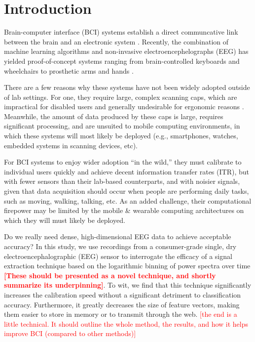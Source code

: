 \section{Introduction}


Brain-computer interface (BCI) systems establish a direct communcative link between the brain and an electronic system \cite{dornhege_toward_2007,mcfarland_brain-computer_2011}.  Recently, the combination of machine learning algorithms and non-invasive electroencephelographs (EEG) has yielded proof-of-concept systems ranging from brain-controlled keyboards and wheelchairs to prosthetic arms and hands \cite{blankertz_note_2007,millan_combining_2010,d._mattia_brain_2011,hill_practical_2014,campbell_neurophone:_2010}. 

There are a few reasons why these systems have not been widely adopted outside of lab settings. For one, they require large, complex scanning caps, which are impractical for disabled users and generally undesirable for ergonomic reasons \cite{ekandem_evaluating_2012,leeb_transferring_2013}. Meanwhile, the amount of data produced by these caps is large, requires significant processing, and are unsuited to mobile computing environments, in which these systems will most likely be deployed (e.g., smartphones, watches, embedded systems in scanning devices, etc). 

For BCI systems to enjoy wider adoption ``in the wild,'' they must calibrate to individual users quickly and achieve decent information transfer rates (ITR), but with fewer sensors than their lab-based counterparts, and with noisier signals, given that data acquisition should occur when people are performing daily tasks, such as moving, walking, talking, etc. As an added challenge, their computational firepower may be limited by the mobile \& wearable computing architectures on which they will must likely be deployed.

Do we really need dense, high-dimensional EEG data to achieve acceptable accuracy? In this study, we use recordings from a consumer-grade single, dry electroencephalographic (EEG) sensor to interrogate the efficacy of a signal extraction technique based on the logarithmic binning of power spectra over time \textcolor{red}{\bf [These should be presented as a novel technique, and shortly summarize its underpinning]}. To wit, we find that this technique significantly increases the calibration speed without a significant detriment to classification accuracy. Furthermore, it greatly decreases the size of feature vectors, making them easier to store in memory or to transmit through the web. \textcolor{red}{[the end is a little technical. It should outline the whole method, the results, and how it helps improve BCI (compared to other methods)]}
